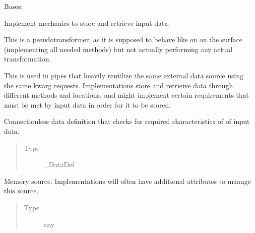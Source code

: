 \documentclass[letterpaper,10pt,english]{sphinxmanual}
\begin{document}

\begin{fulllineitems}
\label{\detokenize{dalio.base:dalio.base.memory.Memory}}
Bases: 

Implement mechanics to store and retrieve input data.

This is a pseudo\sphinxhyphen{}transformer, as it is supposed to behave like on on the
surface (implementing all needed methods) but not actually performing any
actual transformation.

This is used in pipes that heavily reutilize the same external data source
using the same kwarg requests. Implementations store and retrieive data
through different methods and locations, and might implement certain
requirements that must be met by input data in order for it to be stored.

\begin{fulllineitems}
\label{\detokenize{dalio.base:dalio.base.memory.Memory._def}}
Connection\sphinxhyphen{}less data definition that checks for
required characteristics of of input data.
\begin{quote}\begin{description}
\item[{Type}] \leavevmode
\_DataDef

\end{description}\end{quote}

\end{fulllineitems}


\begin{fulllineitems}
\label{\detokenize{dalio.base:dalio.base.memory.Memory._source}}
Memory source. Implementations will often have
additional attributes to manage this source.
\begin{quote}\begin{description}
\item[{Type}] \leavevmode
any


\end{description}
\end{quote}
\end{fulllineitems}
\end{fulllineitems}
\end{document}
